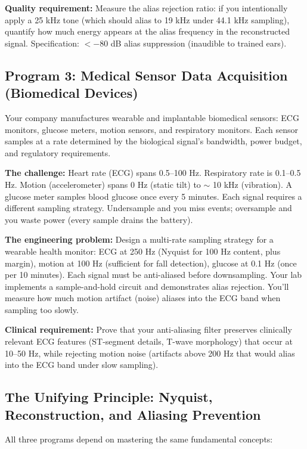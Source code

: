 \documentclass[11pt,letterpaper]{article}
\begin{document}
\textbf{Quality requirement:} Measure the alias rejection ratio: if you intentionally apply a 25 kHz tone (which should alias to 19 kHz under 44.1 kHz sampling), quantify how much energy appears at the alias frequency in the reconstructed signal. Specification: $< -80$ dB alias suppression (inaudible to trained ears).

\subsection{Program 3: Medical Sensor Data Acquisition (Biomedical Devices)}

Your company manufactures wearable and implantable biomedical sensors: ECG monitors, glucose meters, motion sensors, and respiratory monitors. Each sensor samples at a rate determined by the biological signal's bandwidth, power budget, and regulatory requirements.

\textbf{The challenge:} Heart rate (ECG) spans 0.5--100 Hz. Respiratory rate is 0.1--0.5 Hz. Motion (accelerometer) spans 0 Hz (static tilt) to $\sim$ 10 kHz (vibration). A glucose meter samples blood glucose once every 5 minutes. Each signal requires a different sampling strategy. Undersample and you miss events; oversample and you waste power (every sample drains the battery).

\textbf{The engineering problem:} Design a multi-rate sampling strategy for a wearable health monitor: ECG at 250 Hz (Nyquist for 100 Hz content, plus margin), motion at 100 Hz (sufficient for fall detection), glucose at 0.1 Hz (once per 10 minutes). Each signal must be anti-aliased before downsampling. Your lab implements a sample-and-hold circuit and demonstrates alias rejection. You'll measure how much motion artifact (noise) aliases into the ECG band when sampling too slowly.

\textbf{Clinical requirement:} Prove that your anti-aliasing filter preserves clinically relevant ECG features (ST-segment details, T-wave morphology) that occur at 10--50 Hz, while rejecting motion noise (artifacts above 200 Hz that would alias into the ECG band under slow sampling).

\subsection{The Unifying Principle: Nyquist, Reconstruction, and Aliasing Prevention}

All three programs depend on mastering the same fundamental concepts:
\end{document}
